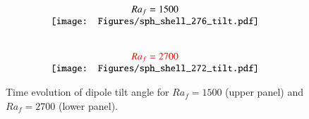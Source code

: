 \begin{figure}[ht]
\begin{center}
\[
\begin{array}{c}
Ra_f = 1500  \\
\texttt{[image: Figures/sph\_shell\_276\_tilt.pdf]} \\
\\
\\
{\color{red}Ra_f = 2700}\\
\texttt{[image: Figures/sph\_shell\_272\_tilt.pdf]} \\
\end{array}
\]
\end{center}
\caption{
Time evolution of dipole tilt angle for $Ra_f = 1500$ (upper panel) and {\color{red}$Ra_f = 2700$} 
(lower panel).
}
\label{Fig:more_cases}
\end{figure}
